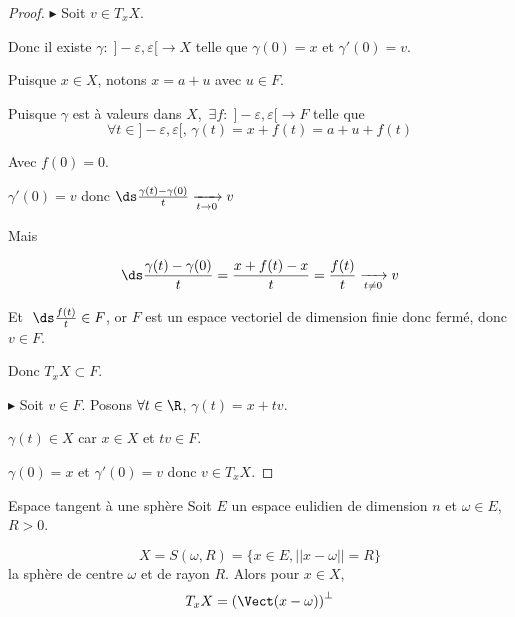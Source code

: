 \begin{proof}
    $\blacktriangleright$ Soit $v \in T_xX$. 

    Donc il existe $\gamma : \; ]- \varepsilon, \varepsilon[ \to X$ telle que 
    $\gamma(0) = x$ et $\gamma'(0) = v$.

    Puisque $x \in X$, notons $x = a + u$ avec $u \in F$.

    Puisque $\gamma$ est à valeurs dans $X$, $\, \exists f : \; ]-\varepsilon, \varepsilon[ \to F$ telle 
    que 
    $$\forall t \in ]- \varepsilon, \varepsilon[, \, \gamma(t) = x + f(t) = a + u + f(t)$$ 
    
    Avec $f(0) = 0$.

    $\gamma'(0) = v$ donc $\ds \frac{\gamma(t) - \gamma(0)}{t} \xrightarrow[t \to 0 ]{} v$
    
    Mais

    $$\ds \frac{\gamma(t) - \gamma(0)}{t } = \frac{x + f(t) - x} t = \frac{f(t)}{t} \xrightarrow[t \neq 0 ]{} v$$

    Et $\; \ds \frac{f(t)}{t} \in F$, or $F$ est un espace vectoriel de dimension finie donc fermé, 
    donc $v \in F$.

    Donc $T_xX \subset F$.

    \lvspace 

    $\blacktriangleright$ Soit $v \in F$. Posons $\forall t \in \R$, $\gamma(t) = x + t v$.

    $\gamma(t) \in X$ car $x \in X$ et $tv \in F$. 

    $\gamma(0) = x $ et $\gamma'(0) = v$ donc $v \in T_xX$.
\end{proof} 

\begin{proposition}{Espace tangent à une sphère}{}
    Soit $E$ un espace eulidien de dimension $n$ et $\omega \in E$, $R > 0$. 

    $$X = S(\omega, R) = \{x \in E, ||x - \omega|| = R\}$$ la sphère de centre $\omega$ et de rayon $R$.
    Alors pour $x \in X$, 
    $$T_xX = \left( \Vect(x - \omega) \right)^\perp$$
\end{proposition}


